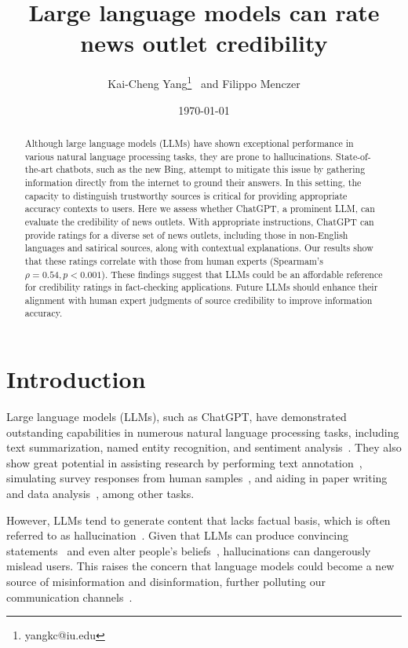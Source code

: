 \documentclass{article}
\title{Large language models can rate news outlet credibility}
\author{Kai-Cheng Yang\thanks{yangkc@iu.edu} ~and Filippo Menczer}
\affil{Observatory on Social Media, Indiana University Bloomington, USA}
\date{\today}
\begin{document}
\maketitle

\begin{abstract}
Although large language models (LLMs) have shown exceptional performance in various natural language processing tasks, they are prone to hallucinations.
State-of-the-art chatbots, such as the new Bing, attempt to mitigate this issue by gathering information directly from the internet to ground their answers.
In this setting, the capacity to distinguish trustworthy sources is critical for providing appropriate accuracy contexts to users.
Here we assess whether ChatGPT, a prominent LLM, can evaluate the credibility of news outlets.
With appropriate instructions, ChatGPT can provide ratings for a diverse set of news outlets, including those in non-English languages and satirical sources, along with contextual explanations.
Our results show that these ratings correlate with those from human experts (Spearmam's $\rho=0.54, p<0.001$).
These findings suggest that LLMs could be an affordable reference for credibility ratings in fact-checking applications.
Future LLMs should enhance their alignment with human expert judgments of source credibility to improve information accuracy.
\end{abstract}

\section{Introduction}

Large language models (LLMs), such as ChatGPT, have demonstrated outstanding capabilities in numerous natural language processing tasks, including text summarization, named entity recognition, and sentiment analysis~\cite{ye2023comprehensive,qin2023chatgpt}.
They also show great potential in assisting research by performing text annotation~\cite{gilardi2023chatgpt}, simulating survey responses from human samples~\cite{argyle2023out,brand2023using}, and aiding in paper writing and data analysis~\cite{korinek2023language}, among other tasks.

However, LLMs tend to generate content that lacks factual basis, which is often referred to as hallucination~\cite{ji2023survey}.
Given that LLMs can produce convincing statements~\cite{jakesch2023human} and even alter people's beliefs~\cite{jakesch2023co}, hallucinations can dangerously mislead users. 
This raises the concern that language models could become a new source of misinformation and disinformation, further polluting our communication channels~\cite{kreps2022news,goldstein2023generative,spitale2023ai}.
\end{document}
